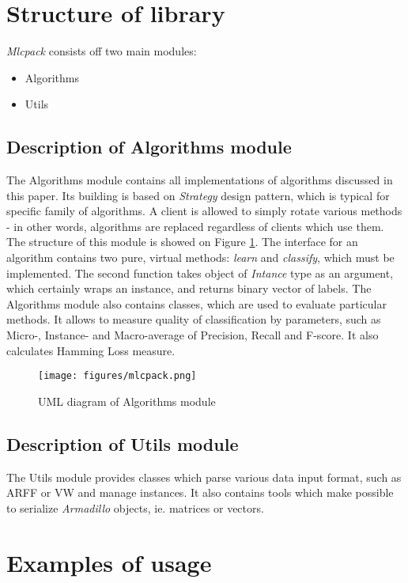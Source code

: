 \section{Structure of library}

\textit{Mlcpack} consists off two main modules:
\begin{itemize}
\item Algorithms
\item Utils
\end{itemize}

\subsection{Description of Algorithms module}

The Algorithms module contains all implementations of algorithms discussed in this paper. Its building is based on \textit{Strategy} design pattern, which is typical for specific family of algorithms. A client is allowed to simply rotate various methods - in other words, algorithms are replaced regardless of clients which use them. The structure of this module is showed on Figure \ref{fig:alg_sh}. 
The interface for an algorithm contains two pure, virtual methods: \textit{learn} and \textit{classify}, which must be implemented. The second function takes object of \textit{Intance} type as an argument, which certainly wraps an instance, and returns binary vector of labels. The Algorithms module also contains classes, which are used to evaluate particular methods. It allows to measure quality of classification by parameters, such as Micro-, Instance- and Macro-average of Precision, Recall and F-score. It also calculates Hamming Loss measure. 

\begin{figure}
\centering
\label{fig:alg_sh}
\caption{UML diagram of Algorithms module}
\texttt{[image: figures/mlcpack.png]}
\end{figure}

\subsection{Description of Utils module}

The Utils module provides classes which parse various data input format, such as ARFF or VW and manage instances. It also contains tools which make possible to serialize \textit{Armadillo} objects, ie. matrices or vectors.   

\section{Examples of usage}

